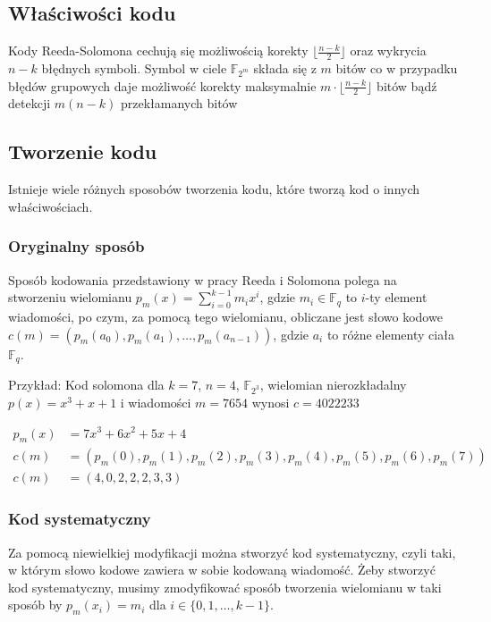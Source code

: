 \subsection{Właściwości kodu}\label{subsection:wlasciwosci}
Kody Reeda-Solomona cechują się możliwością korekty $\lfloor \frac{n-k}{2} \rfloor$
oraz wykrycia $n-k$ błędnych symboli. Symbol w ciele $\mathbb{F}_{2^m}$ składa się
z $m$ bitów co w przypadku błędów grupowych daje możliwość korekty maksymalnie
$m \cdot \lfloor \frac{n-k}{2} \rfloor$ bitów bądź detekcji $m(n-k)$ przekłamanych
bitów

\subsection{Tworzenie kodu}
Istnieje wiele różnych sposobów tworzenia kodu, które tworzą kod o innych właściwościach.


\subsubsection{Oryginalny sposób}\label{subsection:original}
Sposób kodowania przedstawiony w pracy Reeda i Solomona polega na stworzeniu
wielomianu $p_m(x)=\sum_{i=0}^{k-1}m_{i}x^i$, gdzie $m_i\in\mathbb{F}_q$ to
$i$\nobreakdash-ty element wiadomości, po czym, za pomocą tego wielomianu,
obliczane jest słowo kodowe $c(m)=(p_m(a_0), p_m(a_1), \ldots, p_m(a_{n-1}))$,
gdzie $a_i$ to różne elementy ciała $\mathbb{F}_q$.
\newline\newline
\begin{minipage}{\textwidth}
Przykład:
\newline
Kod solomona dla $k=7$, $n=4$, $\mathbb{F}_{2^3}$, wielomian nierozkładalny $p(x) = x^3 + x + 1$ i wiadomości $m = 7654$ wynosi $c = 4022233$
\end{minipage}
\begin{align*}
    p_m(x) &= 7x^3 + 6x^2 + 5x + 4 \\
    c(m) &= (p_m(0), p_m(1), p_m(2), p_m(3), p_m(4), p_m(5), p_m(6), p_m(7)) \\
    c(m) &= (4, 0, 2, 2, 2, 3, 3)
\end{align*}

\subsubsection{Kod systematyczny}\label{subsection:Kod systematyczny}
Za pomocą niewielkiej modyfikacji można stworzyć kod systematyczny, czyli taki, w
którym słowo kodowe zawiera w sobie kodowaną wiadomość.
Żeby stworzyć kod systematyczny, musimy zmodyfikować sposób tworzenia wielomianu w
taki sposób by $p_m(x_i)=m_i$ dla $i \in \{0,1,\ldots,k-1\}$.

